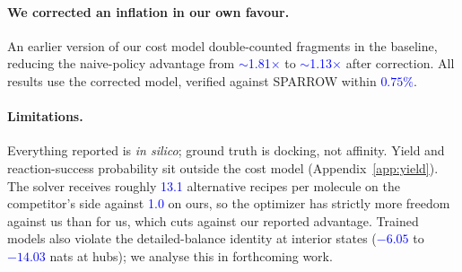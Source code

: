 \documentclass{article}
\newcommand{\checkval}[1]{\textcolor{blue}{#1}}
\begin{document}
\paragraph{We corrected an inflation in our own favour.}
An earlier version of our cost model double-counted fragments in the baseline, reducing the naive-policy advantage from \checkval{$\sim$1.81$\times$} to
\checkval{$\sim$1.13$\times$} after correction. All results use the corrected model, verified against SPARROW within \checkval{$0.75\%$}.

\paragraph{Limitations.}
Everything reported is \emph{in silico}; ground truth is docking, not affinity. Yield and reaction-success probability sit outside the cost model
(Appendix~\ref{app:yield}). The solver receives roughly \checkval{13.1} alternative recipes per molecule on the competitor's side against \checkval{1.0} on ours, so the optimizer has strictly more freedom against us than for us, which cuts against our reported advantage. Trained models also violate the detailed-balance identity at interior states (\checkval{$-6.05$} to \checkval{$-14.03$} nats at hubs); we analyse this in forthcoming work.



\end{document}
